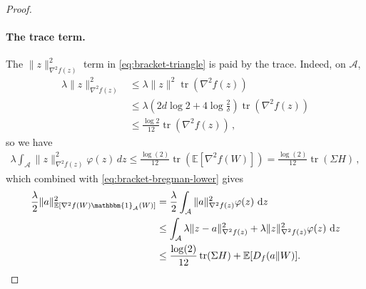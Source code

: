\documentclass{article}
\theoremstyle{plain}
\theoremstyle{definition}
\theoremstyle{plain}
\newcommand{\tr}{\operatorname{tr}}
\newcommand{\E}{\mathbb E}
\renewcommand{\d}[1]{\operatorname{d}\!#1}
\begin{document}
\begin{proof}
    \paragraph{The trace term.}
    The $\|z\|_{\nabla^2f(z)}^2$ term in \eqref{eq:bracket-triangle} is paid by the trace.
    Indeed, on $\mathcal A$,
    \begin{align}
        \lambda\|z\|_{\nabla^2f(z)}^2
         & \leq
        \lambda\|z\|^2\tr(\nabla^2f(z))
        \\
         & \leq
        \lambda\left(
        2d \log 2 + 4 \log \frac{2}{\delta}
        \right)\tr(\nabla^2f(z))
        \\
         & \leq
        \frac{\log2}{12}\tr(\nabla^2f(z))\,,
    \end{align}
    so we have
    \begin{align}
        \lambda \int_{\mathcal{A}} \|z\|_{\nabla^2 f(z)}^2 \varphi(z)\,dz
        \leq
        \frac{\log(2)}{12}
        \tr(\E[\nabla^2 f(W)])
        =
        \frac{\log(2)}{12}
        \tr(\Sigma H)\,,
    \end{align}
    which combined with \eqref{eq:bracket-bregman-lower} gives
    \begin{align}
        \frac{\lambda}{2}
        \|a\|_{\E[\nabla^2f(W) \mathbbm{1}_{\mathcal A}(W)]}^2
         & =
        \frac{\lambda}{2}
        \int_{\mathcal A}
        \|a\|_{\nabla^2f(z)}^2
        \varphi(z)\,\d z \\
         & \leq
        \int_{\mathcal A}
        \lambda
        \|z - a\|_{\nabla^2f(z)}^2
        +
        \lambda
        \|z\|_{\nabla^2f(z)}^2
        \varphi(z)\,\d z \\
         & \leq
        \frac{\log(2)}{12}
        \tr(\Sigma H)
        +
        \E[D_f(a\|W)].
    \end{align}


\end{proof}
\end{document}
